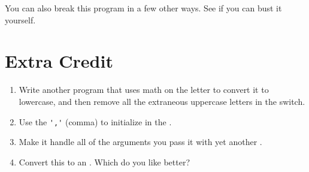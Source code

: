 You can also break this program in a few other ways.  See if you
can bust it yourself.

\section{Extra Credit}

\begin{enumerate}
\item Write another program that uses math on the letter to
    convert it to lowercase, and then remove all the extraneous
    uppercase letters in the switch.
\item Use the \verb|','| (comma) to initialize  
    in the .
\item Make it handle all of the arguments you pass it with 
    yet another .
\item Convert this  to an .
    Which do you like better?
\end{enumerate}

